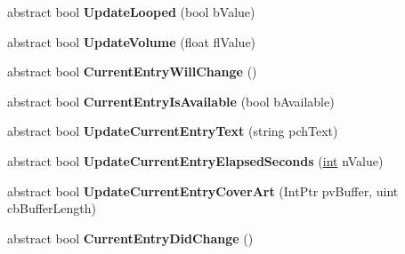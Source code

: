 \begin{DoxyCompactItemize}
\item 
\hypertarget{classValve_1_1Steamworks_1_1ISteamMusicRemote_a7feaf56ac638c804b7d6f052ae90c7d1}{}abstract bool {\bfseries Update\+Looped} (bool b\+Value)\label{classValve_1_1Steamworks_1_1ISteamMusicRemote_a7feaf56ac638c804b7d6f052ae90c7d1}

\item 
\hypertarget{classValve_1_1Steamworks_1_1ISteamMusicRemote_ab6c0351bcd00a2445c3612fc2375de4b}{}abstract bool {\bfseries Update\+Volume} (float fl\+Value)\label{classValve_1_1Steamworks_1_1ISteamMusicRemote_ab6c0351bcd00a2445c3612fc2375de4b}

\item 
\hypertarget{classValve_1_1Steamworks_1_1ISteamMusicRemote_a032751b88699fb1858e6f5ec329f3bf7}{}abstract bool {\bfseries Current\+Entry\+Will\+Change} ()\label{classValve_1_1Steamworks_1_1ISteamMusicRemote_a032751b88699fb1858e6f5ec329f3bf7}

\item 
\hypertarget{classValve_1_1Steamworks_1_1ISteamMusicRemote_a9534f8d66d58b55458c2c1aff4a920a1}{}abstract bool {\bfseries Current\+Entry\+Is\+Available} (bool b\+Available)\label{classValve_1_1Steamworks_1_1ISteamMusicRemote_a9534f8d66d58b55458c2c1aff4a920a1}

\item 
\hypertarget{classValve_1_1Steamworks_1_1ISteamMusicRemote_a5be44340078f52f570814c1fbae6d177}{}abstract bool {\bfseries Update\+Current\+Entry\+Text} (string pch\+Text)\label{classValve_1_1Steamworks_1_1ISteamMusicRemote_a5be44340078f52f570814c1fbae6d177}

\item 
\hypertarget{classValve_1_1Steamworks_1_1ISteamMusicRemote_a39344f2441b2c6cfd9cd46dbc772cc07}{}abstract bool {\bfseries Update\+Current\+Entry\+Elapsed\+Seconds} (\hyperlink{SDL__thread_8h_a6a64f9be4433e4de6e2f2f548cf3c08e}{int} n\+Value)\label{classValve_1_1Steamworks_1_1ISteamMusicRemote_a39344f2441b2c6cfd9cd46dbc772cc07}

\item 
\hypertarget{classValve_1_1Steamworks_1_1ISteamMusicRemote_a30a96a69e08a4ceece5b2aced86e1d4e}{}abstract bool {\bfseries Update\+Current\+Entry\+Cover\+Art} (Int\+Ptr pv\+Buffer, uint cb\+Buffer\+Length)\label{classValve_1_1Steamworks_1_1ISteamMusicRemote_a30a96a69e08a4ceece5b2aced86e1d4e}

\item 
\hypertarget{classValve_1_1Steamworks_1_1ISteamMusicRemote_ae58c38094bd491f4d983409b6ad631be}{}abstract bool {\bfseries Current\+Entry\+Did\+Change} ()\label{classValve_1_1Steamworks_1_1ISteamMusicRemote_ae58c38094bd491f4d983409b6ad631be}


\end{DoxyCompactItemize}
